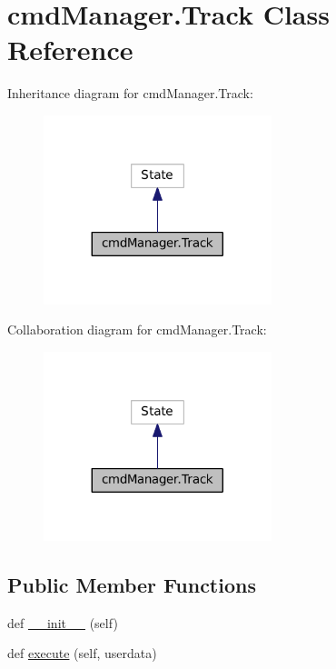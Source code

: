\hypertarget{classcmdManager_1_1Track}{}\section{cmd\+Manager.\+Track Class Reference}
\label{classcmdManager_1_1Track}


Inheritance diagram for cmd\+Manager.\+Track\+:
\nopagebreak
\begin{figure}[H]
\begin{center}
\leavevmode
\includegraphics[width=188pt]{classcmdManager_1_1Track__inherit__graph}
\end{center}
\end{figure}


Collaboration diagram for cmd\+Manager.\+Track\+:
\nopagebreak
\begin{figure}[H]
\begin{center}
\leavevmode
\includegraphics[width=188pt]{classcmdManager_1_1Track__coll__graph}
\end{center}
\end{figure}
\subsection*{Public Member Functions}
\begin{DoxyCompactItemize}
\item 
def \hyperlink{classcmdManager_1_1Track_a796dff8932a4e8e62b32f04b4f8481b6}{\+\_\+\+\_\+init\+\_\+\+\_\+} (self)
\item 
def \hyperlink{classcmdManager_1_1Track_ac3ae09cfd05e6d1f870422e0a8052acd}{execute} (self, userdata)
\end{DoxyCompactItemize}



